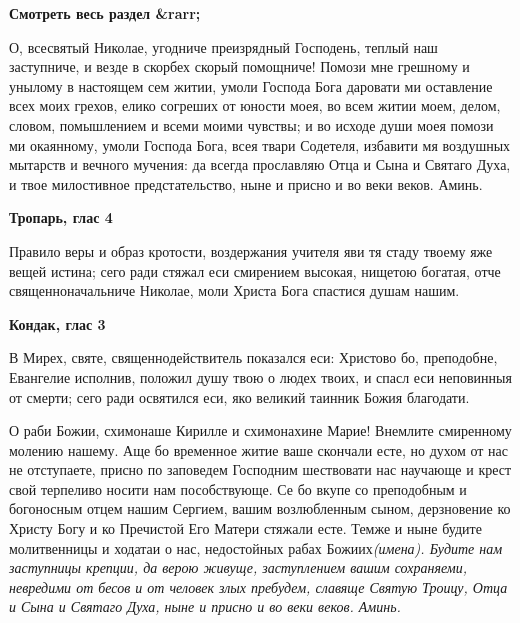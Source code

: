 


\bfseries Смотреть весь раздел &rarr;\normalfont{} 

 

О, всесвятый Николае, угодниче преизрядный Господень, теплый наш заступниче, и везде в скорбех скорый помощниче! Помози мне грешному и унылому в настоящем сем житии, умоли Господа Бога даровати ми оставление всех моих грехов, елико согреших от юности моея, во всем житии моем, делом, словом, помышлением и всеми моими чувствы; и во исходе души моея помози ми окаянному, умоли Господа Бога, всея твари Содетеля, избавити мя воздушных мытарств и вечного мучения: да всегда прославляю Отца и Сына и Святаго Духа, и твое милостивное предстательство, ныне и присно и во веки веков. Аминь.


\medskip


\bfseries Тропарь, глас 4\normalfont{}


Правило веры и образ кротости, воздержания учителя яви тя стаду твоему яже вещей истина; сего ради стяжал еси смирением высокая, нищетою богатая, отче священноначальниче Николае, моли Христа Бога спастися душам нашим.


\medskip


\bfseries Кондак, глас 3\normalfont{}


В Мирех, святе, священнодействитель показался еси: Христово бо, преподобне, Евангелие исполнив, положил душу твою о людех твоих, и спасл еси неповинныя от смерти; сего ради освятился еси, яко великий таинник Божия благодати. 


\mychapterending

 


О раби Божии, схимонаше Кирилле и схимонахине Марие! Внемлите смиренному молению нашему. Аще бо временное житие ваше скончали есте, но духом от нас не отступаете, присно по заповедем Господним шествовати нас научающе и крест свой терпеливо носити нам пособствующе. Се бо вкупе со преподобным и богоносным отцем нашим Сергием, вашим возлюбленным сыном, дерзновение ко Христу Богу и ко Пречистой Его Матери стяжали есте. Темже и ныне будите молитвенницы и ходатаи о нас, недостойных рабах Божиих\itshape  (имена)\normalfont{}. Будите нам заступницы крепции, да верою живуще, заступлением вашим сохраняеми, невредими от бесов и от человек злых пребудем, славяще Святую Троицу, Отца и Сына и Святаго Духа, ныне и присно и во веки веков. Аминь. 


